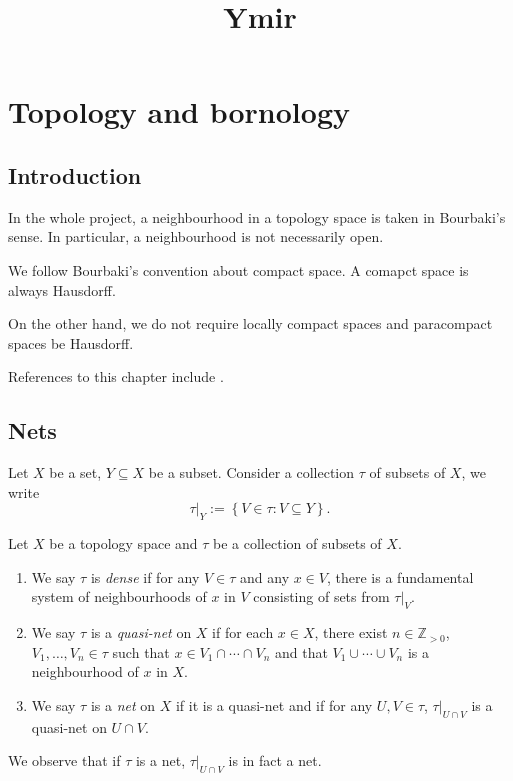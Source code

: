 
\title{Ymir}

\maketitle
\tableofcontents

\chapter*{Topology and bornology}\label{chap-topology}

\section{Introduction}\label{sec-introduction}

In the whole project, a neighbourhood in a topology space is taken in Bourbaki's sense. In particular, a neighbourhood is not necessarily open.

We follow Bourbaki's convention about compact space. A comapct space is always Hausdorff. 

On the other hand, we do not require locally compact spaces and paracompact spaces be Hausdorff.

References to this chapter include \cite{Berk93}.

\section{Nets}\label{sec-nets}

Let $X$ be a set, $Y\subseteq X$ be a subset. Consider a collection $\tau$ of subsets of $X$, we write
\[
    \tau|_Y:=\left\{V\in \tau: V\subseteq Y \right\}.    
\]

\begin{definition}
    Let $X$ be a topology space and $\tau$ be a collection of subsets of $X$. 
    \begin{enumerate}
        \item We say $\tau$ is \emph{dense} if for any $V\in \tau$ and any $x\in V$, there is a fundamental system of neighbourhoods of $x$ in $V$ consisting of sets from $\tau|_V$.
        \item We say $\tau$ is a \emph{quasi-net} on $X$ if for each $x\in X$, there exist $n\in \mathbb{Z}_{>0}$, $V_1,\ldots,V_n\in \tau$ such that $x\in V_1\cap \cdots\cap V_n$ and that $V_1\cup\cdots\cup V_n$ is a neighbourhood of $x$ in $X$.
        \item We say $\tau$ is a \emph{net} on $X$ if it is a quasi-net and if for any $U,V\in \tau$, $\tau|_{U\cap V}$ is a quasi-net on $U\cap V$.
    \end{enumerate}
\end{definition}
We observe that if $\tau$ is a net, $\tau|_{U\cap V}$ is in fact a net.

